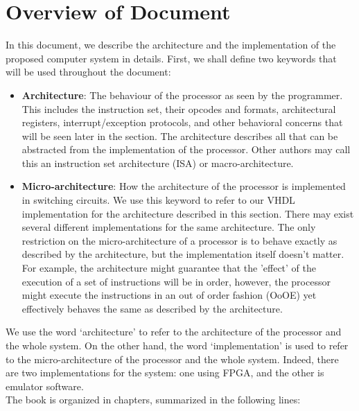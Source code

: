 \documentclass[oneside]{book}
\begin{document}
\section{Overview of Document}

In this document, we describe the architecture and the implementation
of the proposed computer system in details. First, we shall define two
keywords that will be used throughout the document:

\begin{itemize}

\item \textbf{Architecture}:
     The behaviour of the processor as seen by the programmer.
     This includes the instruction set, their opcodes and formats,
     architectural registers, interrupt/exception protocols, and other
     behavioral concerns that will be seen later in the section.
     The architecture describes all that can be abstracted from the
     implementation of the processor. Other authors may call this an
     instruction set architecture (ISA) or macro-architecture.

\item \textbf{Micro-architecture}:
     How the architecture of the processor is implemented
     in switching circuits. We use this keyword to refer to our VHDL
     implementation for the architecture described in this section. There
     may exist several different implementations for the same architecture.
     The only restriction on the micro-architecture of a processor is to
     behave exactly as described by the architecture, but the implementation
     itself doesn't matter. For example, the architecture might guarantee
     that the 'effect' of the execution of a set of instructions will be
     in order, however, the processor might execute the instructions in an
     out of order fashion (OoOE) yet effectively behaves the same as
     described by the architecture.

\end{itemize}

We use the word `architecture' to refer to the architecture of the processor
and the whole system. On the other hand, the word `implementation' is used
to refer to the micro-architecture of the processor and the whole system.
Indeed, there are two implementations for the system: one using FPGA,
and the other is emulator software.\\

The book is organized in chapters, summarized in the following lines:
\end{document}
